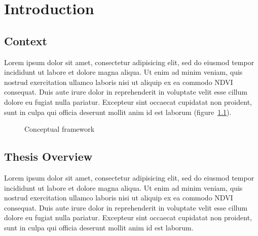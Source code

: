 \chapter[Introduction]{Introduction}
\label{cha:Chapter1}
\vspace*{\fill}


\newpage

\section{Context}

    Lorem ipsum dolor sit amet, consectetur adipisicing elit, sed do eiusmod
    tempor incididunt ut labore et dolore magna aliqua. Ut enim ad minim veniam,
    quis nostrud exercitation ullamco laboris nisi ut aliquip ex ea commodo \ac{NDVI}
    consequat. Duis aute irure dolor in reprehenderit in voluptate velit esse
    cillum dolore eu fugiat nulla pariatur. Excepteur sint occaecat cupidatat non
    proident, sunt in culpa qui officia deserunt mollit anim id est laborum (figure~\ref{fig:conceptualFramework}).

    \begin{figure}[h]
        \caption{Conceptual framework}
        \label{fig:conceptualFramework}
    \end{figure}



\section{Thesis Overview}

    Lorem ipsum dolor sit amet, consectetur adipisicing elit, sed do eiusmod
    tempor incididunt ut labore et dolore magna aliqua. Ut enim ad minim veniam,
    quis nostrud exercitation ullamco laboris nisi ut aliquip ex ea commodo \ac{NDVI}
    consequat. Duis aute irure dolor in reprehenderit in voluptate velit esse
    cillum dolore eu fugiat nulla pariatur. Excepteur sint occaecat cupidatat non
    proident, sunt in culpa qui officia deserunt mollit anim id est laborum.